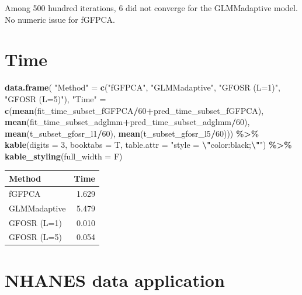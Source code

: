 \documentclass[
]{article}
\newenvironment{Shaded}{\begin{snugshade}}{\end{snugshade}}
\newcommand{\AttributeTok}[1]{\textcolor[rgb]{0.13,0.29,0.53}{#1}}
\newcommand{\DecValTok}[1]{\textcolor[rgb]{0.00,0.00,0.81}{#1}}
\newcommand{\FunctionTok}[1]{\textcolor[rgb]{0.13,0.29,0.53}{\textbf{#1}}}
\newcommand{\NormalTok}[1]{#1}
\newcommand{\OtherTok}[1]{\textcolor[rgb]{0.56,0.35,0.01}{#1}}
\newcommand{\SpecialCharTok}[1]{\textcolor[rgb]{0.81,0.36,0.00}{\textbf{#1}}}
\newcommand{\StringTok}[1]{\textcolor[rgb]{0.31,0.60,0.02}{#1}}
\begin{document}
Among 500 hundred iterations, 6 did not converge for the GLMMadaptive
model. No numeric issue for fGFPCA.

\hypertarget{time}{%
\section{Time}\label{time}}

\begin{Shaded}
\begin{Highlighting}[]
\FunctionTok{data.frame}\NormalTok{(}
  \StringTok{"Method"} \OtherTok{=} \FunctionTok{c}\NormalTok{(}\StringTok{"fGFPCA"}\NormalTok{, }\StringTok{"GLMMadaptive"}\NormalTok{, }\StringTok{"GFOSR (L=1)"}\NormalTok{, }\StringTok{"GFOSR (L=5)"}\NormalTok{),}
  \StringTok{"Time"} \OtherTok{=} \FunctionTok{c}\NormalTok{(}\FunctionTok{mean}\NormalTok{(fit\_time\_subset\_fGFPCA}\SpecialCharTok{/}\DecValTok{60}\SpecialCharTok{+}\NormalTok{pred\_time\_subset\_fGFPCA),}
             \FunctionTok{mean}\NormalTok{(fit\_time\_subset\_adglmm}\SpecialCharTok{+}\NormalTok{pred\_time\_subset\_adglmm}\SpecialCharTok{/}\DecValTok{60}\NormalTok{),}
             \FunctionTok{mean}\NormalTok{(t\_subset\_gfosr\_l1}\SpecialCharTok{/}\DecValTok{60}\NormalTok{), }
             \FunctionTok{mean}\NormalTok{(t\_subset\_gfosr\_l5}\SpecialCharTok{/}\DecValTok{60}\NormalTok{))) }\SpecialCharTok{\%\textgreater{}\%}
  \FunctionTok{kable}\NormalTok{(}\AttributeTok{digits =} \DecValTok{3}\NormalTok{, }\AttributeTok{booktabs =}\NormalTok{ T, }\AttributeTok{table.attr =} \StringTok{"style = }\SpecialCharTok{\textbackslash{}"}\StringTok{color:black;}\SpecialCharTok{\textbackslash{}"}\StringTok{"}\NormalTok{) }\SpecialCharTok{\%\textgreater{}\%}
  \FunctionTok{kable\_styling}\NormalTok{(}\AttributeTok{full\_width =}\NormalTok{ F) }
\end{Highlighting}
\end{Shaded}

\begin{table}
\centering
\begin{tabular}{lr}
\toprule
Method & Time\\
\midrule
fGFPCA & 1.629\\
GLMMadaptive & 5.479\\
GFOSR (L=1) & 0.010\\
GFOSR (L=5) & 0.054\\
\bottomrule
\end{tabular}
\end{table}

\hypertarget{nhanes-data-application}{%
\section{NHANES data application}\label{nhanes-data-application}}
\end{document}
